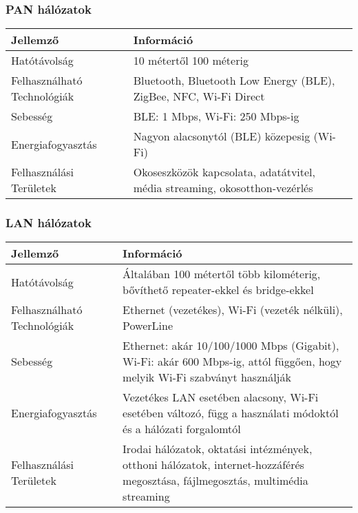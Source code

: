 \subsubsection{PAN hálózatok}
\begin{table}[ht]
    \centering
    \begin{tabularx}{\textwidth}{X X}
    \toprule
    \textbf{Jellemző} & \textbf{Információ} \\
    \midrule
    Hatótávolság & 10 métertől 100 méterig \\
    \hline
    Felhasználható Technológiák & Bluetooth, Bluetooth Low Energy (BLE), ZigBee, NFC, Wi-Fi Direct \\
    \hline
    Sebesség & BLE: 1 Mbps, Wi-Fi: 250 Mbps-ig \\
    \hline
    Energiafogyasztás & Nagyon alacsonytól (BLE) közepesig (Wi-Fi) \\
    \hline
    Felhasználási Területek & Okoseszközök kapcsolata, adatátvitel, média streaming, okosotthon-vezérlés \\
    \bottomrule
    \end{tabularx}
    \label{table:pan_networks}
\end{table}

\clearpage
\subsubsection{LAN hálózatok}
\begin{table}[ht]
    \centering
    \begin{tabularx}{\textwidth}{X X}
    \toprule
    \textbf{Jellemző} & \textbf{Információ} \\
    \midrule
    Hatótávolság & Általában 100 métertől több kilométerig, bővíthető repeater-ekkel és bridge-ekkel \\
    \hline
    Felhasználható Technológiák & Ethernet (vezetékes), Wi-Fi (vezeték nélküli), PowerLine \\
    \hline
    Sebesség & Ethernet: akár 10/100/1000 Mbps (Gigabit), Wi-Fi: akár 600 Mbps-ig, attól függően, hogy melyik Wi-Fi szabványt használják \\
    \hline
    Energiafogyasztás & Vezetékes LAN esetében alacsony, Wi-Fi esetében változó, függ a használati módoktól és a hálózati forgalomtól \\
    \hline
    Felhasználási Területek & Irodai hálózatok, oktatási intézmények, otthoni hálózatok, internet-hozzáférés megosztása, fájlmegosztás, multimédia streaming \\
    \bottomrule
    \end{tabularx}
    \label{table:lan_networks}
\end{table}

